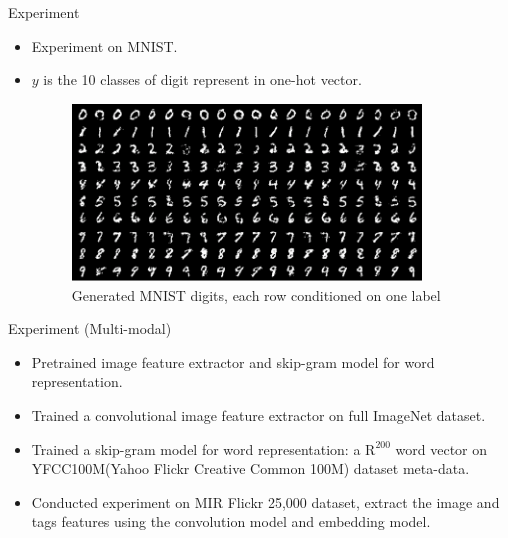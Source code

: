 \documentclass[10pt]{beamer}
\begin{document}
	\begin{frame}{Experiment}
		\begin{itemize}
			\item Experiment on MNIST.
			\onslide<2->
			\item $y$ is the 10 classes of digit represent in one-hot vector.
			\onslide<3->
			\begin{figure}
				\includegraphics<3->[width=25em]{figures/CGAN-experiment-mnist.png}
				\caption{Generated MNIST digits, each row conditioned on one label}
			\end{figure}
		\end{itemize}
	\end{frame}

	\begin{frame}{Experiment (Multi-modal)}
		\begin{itemize}
			\pause
			\item Pretrained image feature extractor and skip-gram model for word representation.
			\pause
			\item Trained a convolutional image feature extractor on full ImageNet dataset.
			\pause
			\item Trained a skip-gram model for word representation: a $\mathrm{R}^{200}$ word vector on YFCC100M(Yahoo Flickr Creative Common 100M) dataset meta-data.
			\pause
			\item Conducted experiment on MIR Flickr 25,000 dataset, extract the image and tags features using the convolution model and embedding model.
		\end{itemize}
	\end{frame}
\end{document}
